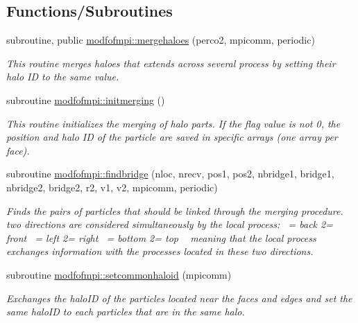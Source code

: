 \subsection*{Functions/\+Subroutines}
\begin{DoxyCompactItemize}
\item 
subroutine, public \hyperlink{namespacemodfofmpi_a8fbc997f93fd71798027bc6946d3bddb}{modfofmpi\+::mergehaloes} (perco2, mpicomm, periodic)
\begin{DoxyCompactList}\small\item\em This routine merges haloes that extends across several process by setting their halo ID to the same value. \end{DoxyCompactList}\item 
subroutine \hyperlink{namespacemodfofmpi_ac5a219c1a82d90230bcb2b1260adc4b4}{modfofmpi\+::initmerging} ()
\begin{DoxyCompactList}\small\item\em This routine initializes the merging of halo parts. If the flag value is not 0, the position and halo ID of the particle are saved in specific arrays (one array per face). \end{DoxyCompactList}\item 
subroutine \hyperlink{namespacemodfofmpi_ad3a945459cf7b001e4c4e51429eb8f31}{modfofmpi\+::findbridge} (nloc, nrecv, pos1, pos2, nbridge1, bridge1, nbridge2, bridge2, r2, v1, v2, mpicomm, periodic)
\begin{DoxyCompactList}\small\item\em Finds the pairs of particles that should be linked through the merging procedure. ~\newline
 two directions are considered simultaneously by the local process\+: ~= back 2= front ~= left 2= right ~= bottom 2= top ~\newline
 meaning that the local process exchanges information with the processes located in these two directions. \end{DoxyCompactList}\item 
subroutine \hyperlink{namespacemodfofmpi_ae5663edf5a2902f952f8d6d3f5c4c8a5}{modfofmpi\+::setcommonhaloid} (mpicomm)
\begin{DoxyCompactList}\small\item\em Exchanges the halo\+ID of the particles located near the faces and edges and set the same halo\+ID to each particles that are in the same halo. \end{DoxyCompactList}\end{DoxyCompactItemize}
